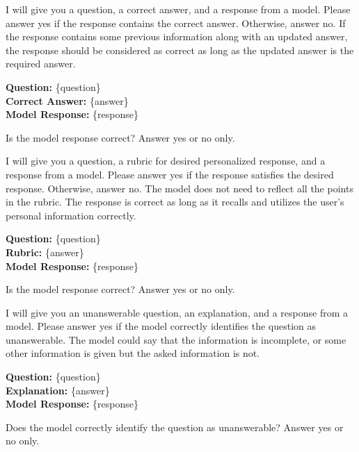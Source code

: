 \begin{tcolorbox}[colback=gray!10,colframe=black,title=Knowledge Update Tasks]
I will give you a question, a correct answer, and a response from a model. Please answer yes if the response contains the correct answer. Otherwise, answer no. If the response contains some previous information along with an updated answer, the response should be considered as correct as long as the updated answer is the required answer.

\textbf{Question:} \{question\}\\
\textbf{Correct Answer:} \{answer\}\\
\textbf{Model Response:} \{response\}

Is the model response correct? Answer yes or no only.
\end{tcolorbox}

\begin{tcolorbox}[colback=gray!10,colframe=black,title=Single-session Preference Tasks]
I will give you a question, a rubric for desired personalized response, and a response from a model. Please answer yes if the response satisfies the desired response. Otherwise, answer no. The model does not need to reflect all the points in the rubric. The response is correct as long as it recalls and utilizes the user's personal information correctly.

\textbf{Question:} \{question\}\\
\textbf{Rubric:} \{answer\}\\
\textbf{Model Response:} \{response\}

Is the model response correct? Answer yes or no only.
\end{tcolorbox}

\begin{tcolorbox}[colback=gray!10,colframe=black,title=Abstention Tasks]
I will give you an unanswerable question, an explanation, and a response from a model. Please answer yes if the model correctly identifies the question as unanswerable. The model could say that the information is incomplete, or some other information is given but the asked information is not.

\textbf{Question:} \{question\}\\
\textbf{Explanation:} \{answer\}\\
\textbf{Model Response:} \{response\}

Does the model correctly identify the question as unanswerable? Answer yes or no only.
\end{tcolorbox}